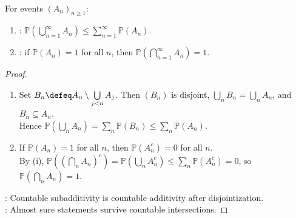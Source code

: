 \begin{proposition} \label{prop:union-bound-and-full-probability-intersections} \\
For events $(A_n)_{n\geq1}$:
\begin{enumerate}[label=(\roman*)]
\setlength{\itemsep}{0pt}
\item {}: $\mathbb{P}(\bigcup\limits_{n=1}^{\infty}A_n)\leq\sum\limits_{n=1}^{\infty}\mathbb{P}(A_n)$.
\item {}: if $\mathbb{P}(A_n)=1$ for all $n$, then $\mathbb{P}(\bigcap\limits_{n=1}^{\infty}A_n)=1$.
\end{enumerate}
\begin{proof}
\begin{enumerate}[label=(\roman*)]
\setlength{\itemsep}{0pt}
\item Set $B_n\defeq A_n\setminus\bigcup\limits_{j<n}A_j$. Then $(B_n)$ is disjoint, $\bigcup\limits_nB_n=\bigcup\limits_nA_n$, and $B_n\subseteq A_n$.\\
Hence $\mathbb{P}(\bigcup\limits_nA_n)=\sum\limits_n\mathbb{P}(B_n)\leq\sum\limits_n\mathbb{P}(A_n)$.
\item If $\mathbb{P}(A_n)=1$ for all $n$, then $\mathbb{P}(A_n^c)=0$ for all $n$.\\
By (i), $\mathbb{P}((\bigcap\limits_nA_n)^c)=\mathbb{P}(\bigcup\limits_nA_n^c)\leq\sum\limits_n\mathbb{P}(A_n^c)=0$, so $\mathbb{P}(\bigcap\limits_nA_n)=1$.
\end{enumerate}
: Countable subadditivity is countable additivity after disjointization.\\
: Almost sure statements survive countable intersections.
\end{proof}
\end{proposition}
